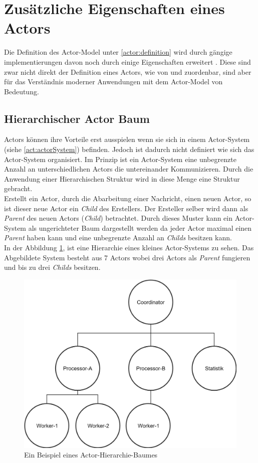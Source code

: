 \section{Zusätzliche Eigenschaften eines Actors}
Die Definition des Actor-Model unter \ref{actor:definition} wird durch gängige implementierungen davon noch durch einige Eigenschaften erweitert \citep{Vernon2015ReactiveAkka}. Diese sind zwar nicht direkt der Definition eines Actors, wie von \cite{Hewitt1973AIntelligence} und \cite{Agha1985ActorsSystems} zuordenbar, sind aber für das Verständnis moderner Anwendungen mit dem Actor-Model von Bedeutung.
\subsection{Hierarchischer Actor Baum}
Actors können ihre Vorteile erst ausspielen wenn sie sich in einem Actor-System (siehe \ref{act:actorSystem}) befinden. Jedoch ist dadurch nicht definiert wie sich das Actor-System organisiert. Im Prinzip ist ein Actor-System eine unbegrenzte Anzahl an unterschiedlichen Actors die untereinander Kommunizieren. Durch die Anwendung einer Hierarchischen Struktur wird in diese Menge eine Struktur gebracht. \\
Erstellt ein Actor, durch die Abarbeitung einer Nachricht, einen neuen Actor, so ist dieser neue Actor ein \textit{Child} des Erstellers. Der Ersteller selber wird dann als \textit{Parent} des neuen Actors (\textit{Child}) betrachtet. Durch dieses Muster kann ein Actor-System als ungerichteter Baum dargestellt werden da jeder Actor maximal einen \textit{Parent} haben kann und eine unbegrenzte Anzahl an \textit{Childs} besitzen kann. \\
In der Abbildung \ref{fig:actor:actorHierarchySample}, ist eine Hierarchie eines kleines Actor-Systems zu sehen. Das Abgebildete System besteht aus 7 Actors wobei drei Actors als \textit{Parent} fungieren und bis zu drei \textit{Childs} besitzen. 
\begin{figure}
    \centering
    \includegraphics[width=0.6\linewidth]{gfx/actor/actorHierarchy}
    \caption{Ein Beispiel eines Actor-Hierarchie-Baumes}
    \label{fig:actor:actorHierarchySample}
\end{figure}

